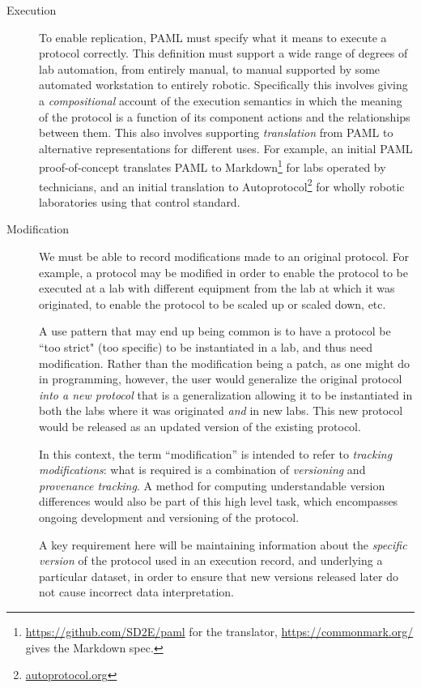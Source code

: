 \begin{description}
\item[Execution] To enable replication, PAML must specify what it means to execute a protocol correctly.  This definition must support a wide range of degrees of lab automation, from entirely manual, to manual supported by some automated workstation to entirely robotic.  Specifically this involves giving a \emph{compositional} account of the execution semantics in which the meaning of the protocol is a function of its component actions and the relationships between them.  This also involves supporting \emph{translation} from PAML to alternative representations for different uses.  For example, an initial PAML proof-of-concept translates PAML to Markdown\footnote{\url{https://github.com/SD2E/paml} for the translator, \url{https://commonmark.org/} gives the Markdown spec.} for labs operated by technicians, and an initial translation to Autoprotocol\footnote{\url{autoprotocol.org}} for wholly robotic laboratories using that control standard.

\item[Modification] We must be able to record modifications made to an original protocol. For example, a protocol may be modified in order to enable the protocol to be executed at a lab with different equipment from the lab at which it was originated, to enable the protocol to be scaled up or scaled down, etc.

A use pattern that may end up being common is to have a protocol be ``too strict" (too specific) to be instantiated in a lab, and thus need modification. Rather than the modification being a patch, as one might do in programming, however, the user would generalize the original protocol \emph{into a new protocol} that is a generalization allowing it to be instantiated in both the labs where it was originated \emph{and} in new labs.  This new protocol would be released as an updated version of the existing protocol.

In this context, the term ``modification'' is intended to refer to \emph{tracking modifications}: what is required is a combination of \emph{versioning} and \emph{provenance tracking}.  A method for computing understandable version differences would also be part of this high level task, which encompasses ongoing development and versioning of the protocol.

A key requirement here will be maintaining information about the \emph{specific version} of the protocol used in an execution record, and underlying a particular dataset, in order to ensure that new versions released later do not cause incorrect data interpretation.


\end{description}

